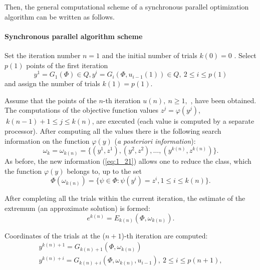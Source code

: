 Then, the general computational scheme of a synchronous parallel optimization algorithm can be written as follows.

\paragraph{\textbf{Synchronous parallel algorithm scheme}}
\begin{description}
\item[\textbf{Step 1}]{Set the iteration number $n=1$  and the initial number of trials $k(0)=0$ . Select $p(1)$ points of the first iteration  
\begin{equation}
\label{eq:1_20}
y^1=G_1(\Phi)\in Q,y^i=G_i(\Phi,u_{i-1}(1))\in Q,\ 2\leq i\leq p(1)
\end{equation}
and assign the number of trials $k(1)=p(1)$.}
\item[\textbf{Step 2}]{Assume that the points of the $n$-th iteration $u(n),\ n\geq 1,$ , have been obtained. The computations of the objective function values $z^j=\varphi(y^j)$,   $\ k(n-1)+1\leq j\leq k(n)$, are executed (each value is computed by a separate processor). After computing all the values there is the following search information on the function $\varphi(y)$ (\textit{a posteriori information}):
\begin{equation}
\label{eq:1_21}
\omega_k=\omega_{k(n)}=\{(y^1,z^1),(y^2,z^2),\ldots ,(y^{k(n)},z^{k(n)})\}.
\end{equation}
As before, the new information (\ref{eq:1_21}) allows one to reduce the class, which the function $\varphi(y)$ belongs to, up to the set   
\begin{equation}
\label{eq:1_22}
\Phi(\omega_{k(n)})=\{\psi\in\Phi:\psi(y^i)=z^i,1\leq i \leq k(n)\}.
\end{equation}
}
\item[\textbf{Step 3}]{After completing all the trials within the current iteration, the estimate of the extremum (an approximate solution) is formed:  
\begin{equation}
\label{eq:1_23}
e^{k(n)}=E_{k(n)}(\Phi,\omega_{k(n)}).
\end{equation}
}
\item[\textbf{Step 4}]{Coordinates of the trials at the ($n+1$)-th iteration are computed:
\begin{equation}
\label{eq:1_24}
\begin{gathered}
y^{k(n)+1}=G_{k(n)+1}(\Phi,\omega_{k(n)}) \\
y^{k(n)+i}=G_{k(n)+i}(\Phi,\omega_{k(n)},u_{i-1}),\  2\leq i\leq p(n+1),

\end{gathered}
\end{equation}}
\end{description}
